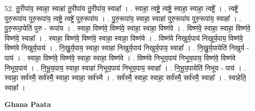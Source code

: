 \documentclass[17pt]{extarticle}
\begin{document}
52. तु॒रीपा॑य॒ स्वाहा॒ स्वाहा॑ तु॒रीपा॑य तु॒रीपा॑य॒ स्वाहा᳚ । . स्वाहा॒ त्वष्ट्रे॒ त्वष्ट्रे॒ स्वाहा॒ स्वाहा॒ त्वष्ट्रे᳚ । . त्वष्ट्रे॑ पुरु॒रूपा॑य पुरु॒रूपा॑य॒ त्वष्ट्रे॒ त्वष्ट्रे॑ पुरु॒रूपा॑य । . पु॒रु॒रूपा॑य॒ स्वाहा॒ स्वाहा॑ पुरु॒रूपा॑य पुरु॒रूपा॑य॒ स्वाहा᳚ । . पु॒रु॒रूपा॒येति॑ पुरु - रूपा॑य । . स्वाहा॒ विष्ण॑वे॒ विष्ण॑वे॒ स्वाहा॒ स्वाहा॒ विष्ण॑वे । . विष्ण॑वे॒ स्वाहा॒ स्वाहा॒ विष्ण॑वे॒ विष्ण॑वे॒ स्वाहा᳚ । . स्वाहा॒ विष्ण॑वे॒ विष्ण॑वे॒ स्वाहा॒ स्वाहा॒ विष्ण॑वे । . विष्ण॑वे निखुर्य॒पाय॑ निखुर्य॒पाय॒ विष्ण॑वे॒ विष्ण॑वे निखुर्य॒पाय॑ । . नि॒खु॒र्य॒पाय॒ स्वाहा॒ स्वाहा॑ निखुर्य॒पाय॑ निखुर्य॒पाय॒ स्वाहा᳚ । . नि॒खु॒र्य॒पायेति॑ निखुर्य - पाय॑ । . स्वाहा॒ विष्ण॑वे॒ विष्ण॑वे॒ स्वाहा॒ स्वाहा॒ विष्ण॑वे । . विष्ण॑वे निभूय॒पाय॑ निभूय॒पाय॒ विष्ण॑वे॒ विष्ण॑वे निभूय॒पाय॑ । . नि॒भू॒य॒पाय॒ स्वाहा॒ स्वाहा॑ निभूय॒पाय॑ निभूय॒पाय॒ स्वाहा᳚ । . नि॒भू॒य॒पायेति॑ निभूय - पाय॑ । . स्वाहा॒ सर्व॑स्मै॒ सर्व॑स्मै॒ स्वाहा॒ स्वाहा॒ सर्व॑स्मै । . सर्व॑स्मै॒ स्वाहा॒ स्वाहा॒ सर्व॑स्मै॒ सर्व॑स्मै॒ स्वाहा᳚ । . स्वाहेति॒ स्वाहा᳚ । \newline

\textbf{Ghana Paata } \newline
\end{document}
